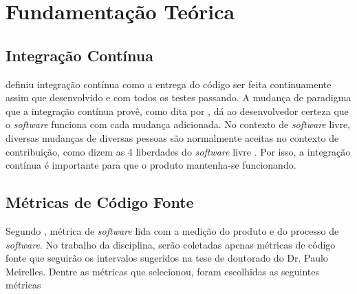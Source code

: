 \chapter[Fundamentação Teórica]{Fundamentação Teórica}

\section{Integração Contínua}

 definiu integração contínua como a entrega do código ser feita continuamente assim que desenvolvido e com todos os testes passando. A mudança de paradigma que a integração contínua provê, como dita por , dá ao desenvolvedor certeza que o \textit{software} funciona com cada mudança adicionada. No contexto de \textit{software} livre, diversas mudanças de diversas pessoas são normalmente aceitas no contexto de contribuição, como dizem as 4 liberdades do \textit{software} livre \cite{softwarelivre}. Por isso, a integração contínua é importante para que o produto mantenha-se funcionando.

\section{Métricas de Código Fonte}

Segundo , métrica de \textit{software} lida com a medição do produto e do processo de \textit{software}. No trabalho da disciplina, serão coletadas apenas métricas de código fonte que seguirão os intervalos sugeridos na tese de doutorado do Dr. Paulo Meirelles. Dentre as métricas que  selecionou, foram escolhidas as seguintes métricas

